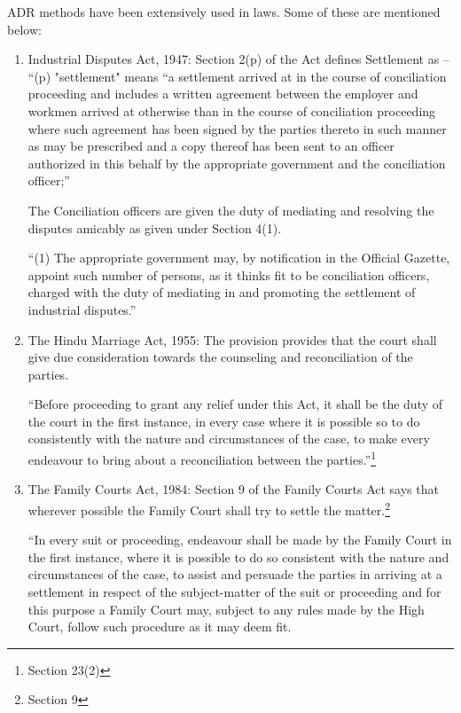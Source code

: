 \begin{multicols}{2}

\noi
ADR methods have been extensively used in laws. Some of these are mentioned below:

\begin{enumerate}
\item Industrial Disputes Act, 1947: Section 2(p) of the Act defines Settlement as – “(p)
"settlement" means “a settlement arrived at in the course of conciliation proceeding and
includes a written agreement between the employer and workmen arrived at otherwise than in
the course of conciliation proceeding where such agreement has been signed by the parties
thereto in such manner as may be prescribed and a copy thereof has been sent to an officer
authorized in this behalf by the appropriate government and the conciliation officer;”

\noi
The Conciliation officers are given the duty of mediating and resolving the disputes amicably
as given under Section 4(1).

\noi
“(1) The appropriate government may, by notification in the Official Gazette, appoint such
number of persons, as it thinks fit to be conciliation officers, charged with the duty of mediating
in and promoting the settlement of industrial disputes.”

\item The Hindu Marriage Act, 1955: The provision provides that the court shall give due
consideration towards the counseling and reconciliation of the parties.

\noi
“Before proceeding to grant any relief under this Act, it shall be the duty of the court in the first
instance, in every case where it is possible so to do consistently with the nature and circumstances of the case, to make every endeavour to bring about a reconciliation between the parties.”\footnote{Section 23(2)}

\item The Family Courts Act, 1984: Section 9 of the Family Courts Act says that wherever possible the Family Court shall try to settle the matter.\footnote{Section 9}

\noi
“In every suit or proceeding, endeavour shall be made by the Family Court in the first instance,
where it is possible to do so consistent with the nature and circumstances of the case, to assist
and persuade the parties in arriving at a settlement in respect of the subject-matter of the suit
or proceeding and for this purpose a Family Court may, subject to any rules made by the High
Court, follow such procedure as it may deem fit.
\end{enumerate}


\end{multicols}
